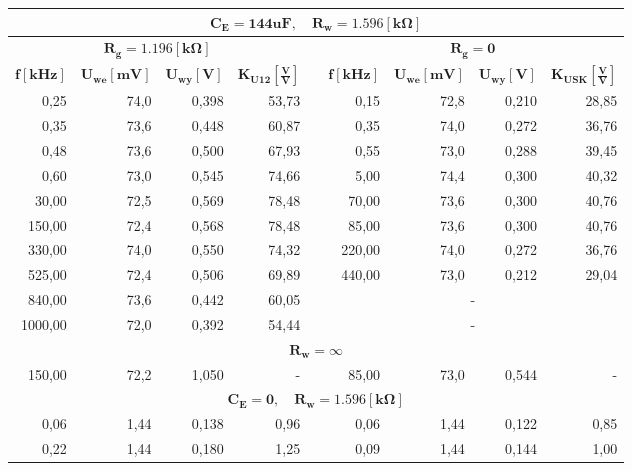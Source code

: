 \documentclass[a4paper,12pt]{article}
\begin{document}
\begin{table}[ht]
  \begin{center}
  \begin{tabular}{|r|r|r|r|r|r|r|r|r|}
    \hline
    \multicolumn{9}{|c|}{\textbf{$\mathbf{C_E = 144uF}, \quad \mathbf{R_w=1.596[k\Omega]}$}} \\ \hline
    \multicolumn{4}{|c|}{$\mathbf{R_g = 1.196[k\Omega]}$} & & \multicolumn{4}{c|}{$\mathbf{R_g = 0}$} \\ \cline{1-4} \cline{6-9}
    $\mathbf{f[kHz]}$ & $\mathbf{U_{we}[mV]}$ & $\mathbf{U_{wy}[V]}$ & $\mathbf{K_{U12}[\frac{V}{V}]}$ & & $\mathbf{f[kHz]}$ & $\mathbf{U_{we}[mV]}$ & $\mathbf{U_{wy}[V]}$ & $\mathbf{K_{USK}[\frac{V}{V}]}$ \\ \cline{1-4} \cline{6-9}
    0,25 & 74,0 & 0,398 & 53,73 & & 0,15 & 72,8 & 0,210 & 28,85 \\ \cline{1-4} \cline{6-9}
    0,35 & 73,6 & 0,448 & 60,87 & & 0,35 & 74,0 & 0,272 & 36,76 \\ \cline{1-4} \cline{6-9}
    0,48 & 73,6 & 0,500 & 67,93 & & 0,55 & 73,0 & 0,288 & 39,45 \\ \cline{1-4} \cline{6-9}
    0,60 & 73,0 & 0,545 & 74,66 & & 5,00 & 74,4 & 0,300 & 40,32 \\ \cline{1-4} \cline{6-9}
    30,00 & 72,5 & 0,569 & 78,48 & & 70,00 & 73,6 & 0,300 & 40,76 \\ \cline{1-4} \cline{6-9}
    150,00 & 72,4 & 0,568 & 78,48 & & 85,00 & 73,6 & 0,300 & 40,76 \\ \cline{1-4} \cline{6-9}
    330,00 & 74,0 & 0,550 & 74,32 & & 220,00 & 74,0 & 0,272 & 36,76 \\ \cline{1-4} \cline{6-9}
    525,00 & 72,4 & 0,506 & 69,89 & & 440,00 & 73,0 & 0,212 & 29,04 \\ \cline{1-4} \cline{6-9}
    840,00 & 73,6 & 0,442 & 60,05 & & \multicolumn{4}{c|}{-} \\ \cline{1-4} \cline{6-9}
    1000,00 & 72,0 & 0,392 & 54,44 & & \multicolumn{4}{c|}{-} \\ \hline
    \multicolumn{9}{|c|}{$\mathbf{R_w = \infty}$} \\ \hline
    150,00 & 72,2 & 1,050 & - & & 85,00 & 73,0 & 0,544 & - \\ \hline
    \multicolumn{9}{|c|}{\textbf{$\mathbf{C_E = 0}, \quad \mathbf{R_w=1.596[k\Omega]}$}} \\ \hline
    0,06 & 1,44 & 0,138 & 0,96 & & 0,06 & 1,44 & 0,122 & 0,85 \\ \cline{1-4} \cline{6-9}
    0,22 & 1,44 & 0,180 & 1,25 & & 0,09 & 1,44 & 0,144 & 1,00 \\ \cline{1-4} \cline{6-9}

\end{tabular}
\end{center}
\end{table}
\end{document}
